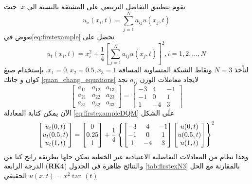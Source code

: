\begin{solution}
	نقوم بتطبيق التفاضل التربيعي على المشتقة بالنسبة الى $x$. حيث 
	\[
	u_x(x_i, t) = \sum_{j=1}^{N} a_{ij} u(x_j, t)
	\]
	نعوض في\eqref{eq:firstexample} نحصل على
	\begin{equation}
		\label{eq:firstexampleDQM}
		u_t(x_i, t) = x_i^2 + \frac{1}{4} \left[\sum_{j=1}^{N} a_{ij} u(x_j, t)\right]^2, i=1,2,\dots,N
	\end{equation}
لنأخذ $N=3$ ونقاط الشبكة المتساوية المسافة $x_1=0, x_2=0.5, x_3=1 $. بإستخدام صيغ كوان و جانك \eqref{quan_chang_equations} لايجاد معاملات الوزن $a_{ij}$ نجد
\begin{equation*}
\begin{bmatrix}
	a_{11}&a_{12}&a_{13}\\
	a_{21}&a_{22}&a_{23}\\
	a_{31}&a_{32}&a_{33}
\end{bmatrix}=\begin{bmatrix}
	-3&4&-1\\
	-1&0&1\\
	1&-4&3
\end{bmatrix}
\end{equation*}
الآن يمكن كتابة المعادلة \eqref{eq:firstexampleDQM} على الشكل 
\begin{equation*}
	\begin{bmatrix}
		u_t(0,t)\\
		u_t(0.5,t)\\
		u_t(1,t)
	\end{bmatrix}=\begin{bmatrix}
		0\\
		0.25\\
		1
	\end{bmatrix}+\frac{1}{4}\left\{\begin{bmatrix}
			-3&4&-1\\
			-1&0&1\\
			1&-4&3
		\end{bmatrix}\begin{bmatrix}
			u(0,t)\\
			u(0.5,t)\\
			u(1,t)
	\end{bmatrix}\right\}^2
\end{equation*}
وهذا نظام من المعادلات التفاضلية الاعتيادية غير الخطية يمكن حلها بطريقة رانج كتا من الدرجة الرابعة (\textbf{RK4}) والنتائج ظاهرة في الجدول \ref{tab:firstexN3}
بالمقارنة مع الحل الحقيقي $u(x, t) = x^2 \tan(t)$



\end{solution}
